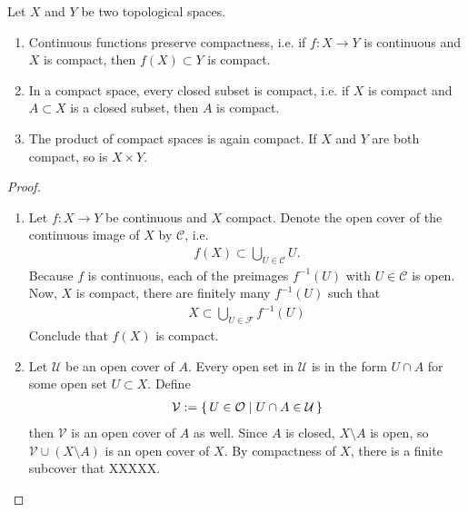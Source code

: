 \begin{thmbox}
    \begin{proposition}
        Let \(X\) and \(Y\) be two topological spaces.
        \begin{enumerate}
            \item Continuous functions preserve compactness, i.e. if \(f: X \longrightarrow Y\) is continuous and \(X\) is compact, then \(f(X) \subset Y\) is compact.
            \item In a compact space, every closed subset is compact, i.e. if \(X\) is compact and \(A \subset X\) is a closed subset, then \(A\) is compact.
            \item The product of compact spaces is again compact. If \(X\) and \(Y\) are both compact, so is \(X \times Y\).
        \end{enumerate}
    \end{proposition}
\end{thmbox}

\begin{proof}
    \begin{enumerate}
        \item Let \(f: X \longrightarrow Y\) be continuous and \(X\) compact. Denote the open cover of the continuous image of \(X\) by \(\mathcal{C}\), i.e.
        \begin{align*}
            f(X) \subset \bigcup_{U \in \mathcal{C}} U \text{.}
        \end{align*}
        Because \(f\) is continuous, each of the preimages \(f^{-1}(U)\) with \(U \in \mathcal{C}\) is open. Now, \(X\) is compact, there are finitely many \(f^{-1}(U)\) such that
        \begin{align*}
            X \subset \bigcup_{U \in \mathcal{F}} f^{-1}(U)
        \end{align*}
        Conclude that \(f(X)\) is compact.
        \item Let \(\mathcal{U}\) be an open cover of \(A\). Every open set in \(\mathcal{U}\) is in the form \(U \cap A\) for some open set \(U \subset X\). Define
        \begin{align*}
            \mathcal{V} := \left\{\, U \in \mathcal{O} \mid U \cap A \in \mathcal{U} \,\right\}
        \end{align*}
        then \(\mathcal{V}\) is an open cover of \(A\) as well. Since \(A\) is closed, \(X \setminus A\) is open, so \(\mathcal{V} \cup (X \setminus A)\) is an open cover of \(X\). By compactness of \(X\), there is a finite subcover that XXXXX.
    \end{enumerate}
\end{proof}

